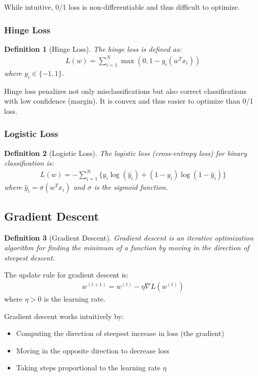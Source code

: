 \documentclass{article}
\newtheorem{definition}{Definition}
\begin{document}
While intuitive, 0/1 loss is non-differentiable and thus difficult to optimize.

\subsubsection{Hinge Loss}
\begin{definition}[Hinge Loss]
The hinge loss is defined as:
\begin{align}
L(w) = \sum_{i=1}^{N}\max(0, 1 - y_i(w^Tx_i))
\end{align}
where $y_i \in \{-1, 1\}$.
\end{definition}

Hinge loss penalizes not only misclassifications but also correct classifications with low confidence (margin). It is convex and thus easier to optimize than 0/1 loss.

\subsubsection{Logistic Loss}
\begin{definition}[Logistic Loss]
The logistic loss (cross-entropy loss) for binary classification is:
\begin{align}
L(w) = -\sum_{i=1}^{N}\{y_i\log(\hat{y}_i) + (1-y_i)\log(1-\hat{y}_i)\}
\end{align}
where $\hat{y}_i = \sigma(w^Tx_i)$ and $\sigma$ is the sigmoid function.
\end{definition}

\subsection{Gradient Descent}
\begin{definition}[Gradient Descent]
Gradient descent is an iterative optimization algorithm for finding the minimum of a function by moving in the direction of steepest descent.
\end{definition}

The update rule for gradient descent is:
\begin{align}
w^{(t+1)} = w^{(t)} - \eta\nabla L(w^{(t)})
\end{align}
where $\eta > 0$ is the learning rate.

Gradient descent works intuitively by:
\begin{itemize}
\item Computing the direction of steepest increase in loss (the gradient)
\item Moving in the opposite direction to decrease loss
\item Taking steps proportional to the learning rate $\eta$
\end{itemize}
\end{document}
